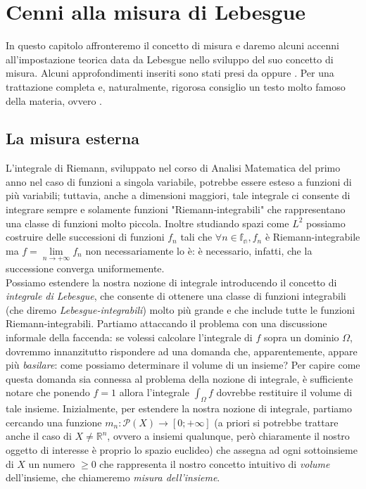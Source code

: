 \chapter{Cenni alla misura di Lebesgue}
\pagestyle{plain}
\thispagestyle{empty}
\pagestyle{fancy}
In questo capitolo affronteremo il concetto di misura e daremo alcuni accenni all'impostazione teorica data da Lebesgue nello sviluppo
del suo concetto di misura. Alcuni approfondimenti inseriti sono stati presi da \cite{rudin} oppure \cite{tao}. Per una trattazione completa e, naturalmente, rigorosa consiglio un testo molto famoso della materia, ovvero \cite{measure_theory}.
%
\vspace{0.5cm}
\section{La misura esterna}
%
L'integrale di Riemann, sviluppato nel corso di Analisi Matematica del primo anno nel caso di funzioni a singola variabile, potrebbe essere esteso a funzioni di più variabili; tuttavia, anche a dimensioni maggiori, tale integrale ci consente di integrare sempre e solamente funzioni "Riemann-integrabili" che rappresentano una classe di funzioni molto piccola. Inoltre studiando spazi come $L^2$ possiamo costruire delle successioni di funzioni $f_n$ tali che $\forall n \in \mathbb{f_n}, f_n$ è Riemann-integrabile ma $f = \lim\limits_{n \to +\infty} f_n$ non necessariamente lo è: è necessario, infatti, che la successione converga uniformemente. \\
Possiamo estendere la nostra nozione di integrale introducendo il concetto di \emph{integrale di Lebesgue}, che consente di ottenere una classe di funzioni integrabili (che diremo \emph{Lebesgue-integrabili}) molto più grande e che include tutte le funzioni Riemann-integrabili. 
Partiamo attaccando il problema con una discussione informale della faccenda: se volessi calcolare l'integrale di $f$ sopra un dominio $\Omega$, dovremmo innanzitutto rispondere ad una domanda che, apparentemente, appare più \emph{basilare}: come possiamo determinare il volume di un insieme? Per capire come questa domanda sia connessa al problema della nozione di integrale, è sufficiente notare che ponendo $f = 1$ allora l'integrale $\int_\Omega f$ dovrebbe restituire il volume di tale insieme. Inizialmente, per estendere la nostra nozione di integrale, partiamo cercando una funzione $m_n: \mathcal{P}(X) \to [0; +\infty]$ (a priori si potrebbe trattare anche il caso di $X \neq \mathbb{R}^n$, ovvero a insiemi qualunque, però chiaramente il nostro oggetto di interesse è proprio lo spazio euclideo) che assegna ad ogni sottoinsieme di $X$ un numero $\geq 0$ che rappresenta il nostro concetto intuitivo di \emph{volume} dell'insieme, che chiameremo \emph{misura dell'insieme}. \\
